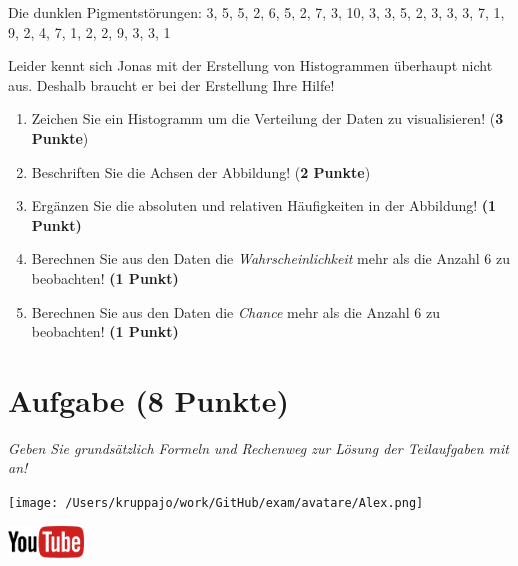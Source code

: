 \documentclass[a4paper, 9pt]{scrartcl}\usepackage[]{graphicx}\usepackage[]{xcolor}
\begin{document}
\begin{center}
Die dunklen Pigmentstörungen: 3, 5, 5, 2, 6, 5, 2, 7, 3, 10, 3, 3, 5, 2, 3, 3, 3, 7, 1, 9, 2, 4, 7, 1, 2, 2, 9, 3, 3, 1
\end{center}

Leider kennt sich Jonas mit der Erstellung von Histogrammen überhaupt nicht aus. Deshalb braucht er bei der Erstellung Ihre Hilfe!

\begin{enumerate}
\item Zeichen Sie ein Histogramm um die Verteilung der Daten zu visualisieren! (\textbf{3 Punkte})
\item Beschriften Sie die Achsen der Abbildung! (\textbf{2 Punkte})
\item Ergänzen Sie die absoluten und relativen Häufigkeiten in der
  Abbildung! \textbf{(1 Punkt)}
\item Berechnen Sie aus den Daten die \textit{Wahrscheinlichkeit}
  mehr als die Anzahl 6 zu beobachten! \textbf{(1
    Punkt)}
\item Berechnen Sie aus den Daten die \textit{Chance} mehr
  als die Anzahl 6 zu beobachten! \textbf{(1 Punkt)}
\end{enumerate}

 
\clearpage

\section{Aufgabe \hfill (8 Punkte)}

\textit{Geben Sie grundsätzlich Formeln und Rechenweg zur Lösung der Teilaufgaben mit an!} \\[1Ex]
 

 
\begin{minipage}[t]{0.5\textwidth}
\texttt{[image: /Users/kruppajo/work/GitHub/exam/avatare/Alex.png]}
\end{minipage}
\begin{minipage}[t]{0.5\textwidth}
\hfill
\href{https://youtu.be/ORHSPTCdfeY}{\includegraphics[width = 2cm]{img/youtube}}\\[1Ex]
\end{minipage}
\vspace{1ex}
\end{document}
